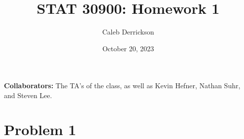 

\title{STAT 30900: Homework 1}
\author{Caleb Derrickson}
\date{October 20, 2023}


\onehalfspacing
\maketitle

{\color{cit}\vspace{2mm}\noindent\textbf{Collaborators:}} The TA's of the class, as well as Kevin Hefner, Nathan Suhr, and Steven Lee.

\tableofcontents

\newpage
\section{Problem 1}

